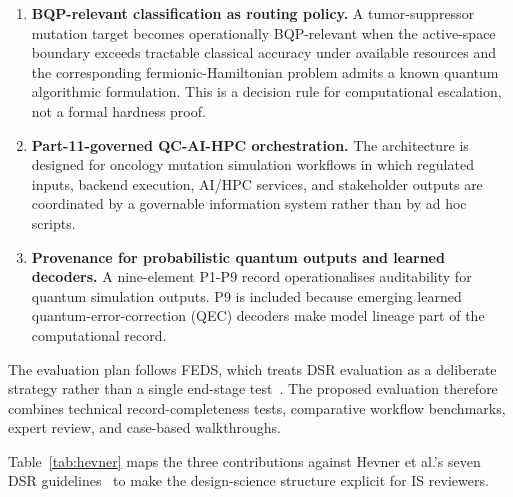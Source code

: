 \documentclass[11pt,letterpaper]{article}
\begin{document}
\begin{enumerate}[leftmargin=1.5em,itemsep=3pt]
\item \textbf{BQP-relevant classification as routing policy.}  A tumor-suppressor mutation
target becomes operationally BQP-relevant when the active-space boundary exceeds tractable
classical accuracy under available resources and the corresponding fermionic-Hamiltonian problem
admits a known quantum algorithmic formulation.  This is a decision rule for computational
escalation, not a formal hardness proof.

\item \textbf{Part-11-governed QC-AI-HPC orchestration.}  The architecture is designed for
oncology mutation simulation workflows in which regulated inputs, backend execution, AI/HPC
services, and stakeholder outputs are coordinated by a governable information system rather
than by ad hoc scripts.

\item \textbf{Provenance for probabilistic quantum outputs and learned decoders.}  A
nine-element P1-P9 record operationalises auditability for quantum simulation outputs.  P9
is included because emerging learned quantum-error-correction (QEC) decoders make model
lineage part of the computational record.
\end{enumerate}

The evaluation plan follows FEDS, which treats DSR evaluation as a deliberate strategy rather
than a single end-stage test~\cite{venable2016}.  The proposed evaluation therefore combines
technical record-completeness tests, comparative workflow benchmarks, expert review, and
case-based walkthroughs.

Table~\ref{tab:hevner} maps the three contributions against Hevner et al.'s seven DSR
guidelines~\cite{hevner2004} to make the design-science structure explicit for IS reviewers.
\end{document}
